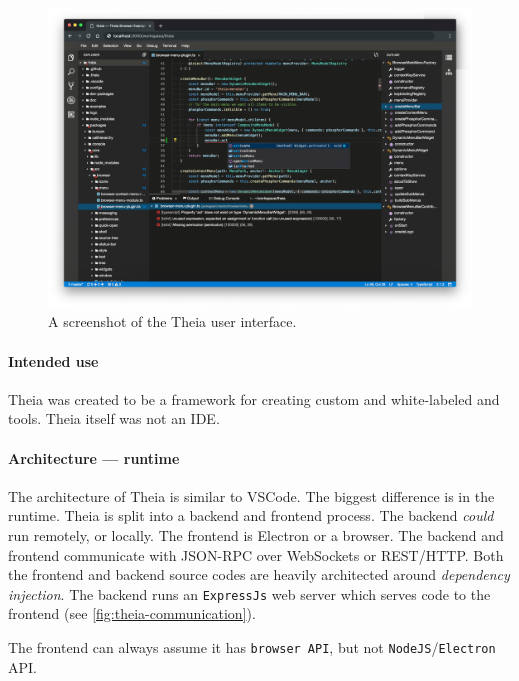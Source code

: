 \begin{figure}[htbp]
  \centering
  \includegraphics[width=\textwidth]{figures/theia-screenshot.png}
  \caption[Theia User Interface]{A screenshot of the Theia user interface.~\cite{eclipsefoundationEclipsetheiaTheia2020}}\label{fig:theia-user-interface}
\end{figure}

\paragraph*{Intended use}
\Gls{Theia} was created to be a framework for creating custom and
white-labeled  and tools. Theia itself was not an IDE.~\cite{helmingEclipseTheiaIDE2019}

\paragraph*{Architecture --- runtime}
The architecture of Theia is similar to \gls{VSCode}.
The biggest difference is in the runtime.
\Gls{Theia} is split into a backend and frontend process. 
The backend \textit{could} run remotely, or locally. 
The frontend is \gls{Electron} or a browser.
The backend and frontend communicate with \gls{JSON-RPC} over \glspl{WebSocket} or \gls{REST}/HTTP\@. 
Both the frontend and backend source codes are heavily architected around
\emph{dependency injection}.
The backend runs an \texttt{ExpressJs} web server which serves code to the frontend (see \cref{fig:theia-communication}).~\cite{typefoxArchitectureOverview}

The frontend can always assume it has \texttt{browser API}, but not
\texttt{NodeJS}/\texttt{Electron} \gls{API}.~\cite{typefoxArchitectureOverview}


